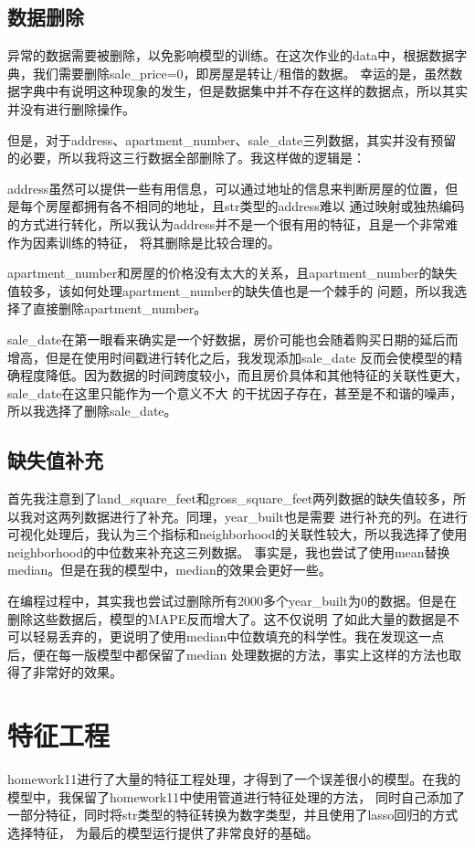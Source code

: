 \documentclass{ctexart}
\begin{document}
    \subsection{数据删除}
    异常的数据需要被删除，以免影响模型的训练。在这次作业的data中，根据数据字典，我们需要删除sale\_price=0，即房屋是转让/租借的数据。
    幸运的是，虽然数据字典中有说明这种现象的发生，但是数据集中并不存在这样的数据点，所以其实并没有进行删除操作。\par
    但是，对于address、apartment\_number、sale\_date三列数据，其实并没有预留的必要，所以我将这三行数据全部删除了。我这样做的逻辑是：\par
    address虽然可以提供一些有用信息，可以通过地址的信息来判断房屋的位置，但是每个房屋都拥有各不相同的地址，且str类型的address难以
    通过映射或独热编码的方式进行转化，所以我认为address并不是一个很有用的特征，且是一个非常难作为因素训练的特征，
    将其删除是比较合理的。\par
    apartment\_number和房屋的价格没有太大的关系，且apartment\_number的缺失值较多，该如何处理apartment\_number的缺失值也是一个棘手的
    问题，所以我选择了直接删除apartment\_number。\par
    sale\_date在第一眼看来确实是一个好数据，房价可能也会随着购买日期的延后而增高，但是在使用时间戳进行转化之后，我发现添加sale\_date
    反而会使模型的精确程度降低。因为数据的时间跨度较小，而且房价具体和其他特征的关联性更大，sale\_date在这里只能作为一个意义不大
    的干扰因子存在，甚至是不和谐的噪声，所以我选择了删除sale\_date。\par

    \subsection{缺失值补充}
    首先我注意到了land\_square\_feet和gross\_square\_feet两列数据的缺失值较多，所以我对这两列数据进行了补充。同理，year\_built也是需要
    进行补充的列。在进行可视化处理后，我认为三个指标和neighborhood的关联性较大，所以我选择了使用neighborhood的中位数来补充这三列数据。
    事实是，我也尝试了使用mean替换median。但是在我的模型中，median的效果会更好一些。\par
    在编程过程中，其实我也尝试过删除所有2000多个year\_built为0的数据。但是在删除这些数据后，模型的MAPE反而增大了。这不仅说明
    了如此大量的数据是不可以轻易丢弃的，更说明了使用median中位数填充的科学性。我在发现这一点后，便在每一版模型中都保留了median
    处理数据的方法，事实上这样的方法也取得了非常好的效果。\par

\section{特征工程}
homework11进行了大量的特征工程处理，才得到了一个误差很小的模型。在我的模型中，我保留了homework11中使用管道进行特征处理的方法，
同时自己添加了一部分特征，同时将str类型的特征转换为数字类型，并且使用了lasso回归的方式选择特征，
为最后的模型运行提供了非常良好的基础。\par
\end{document}
